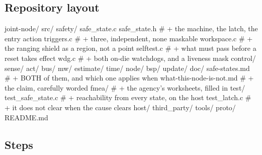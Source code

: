 \subsection*{Repository layout}

\begin{plaincode}
joint-node/
  src/
    safety/
      safe_state.c safe_state.h   # + the machine, the latch, the entry action
      triggers.c                  # + three, independent, none maskable
      workspace.c                 # + the ranging shield as a region, not a point
      selftest.c                  # + what must pass before a reset takes effect
      wdg.c                       # + both on-die watchdogs, and a liveness mask
    control/ sense/ act/ bus/ mw/ estimate/ time/ node/ bsp/  update/
  doc/
    safe-states.md                # + BOTH of them, and which one applies when
    what-this-node-is-not.md      # + the claim, carefully worded
    fmea/                         # + the agency's worksheets, filled in
  test/
    test_safe_state.c             # + reachability from every state, on the host
    test_latch.c                  # + it does not clear when the cause clears
  host/  third_party/  tools/  proto/  README.md
\end{plaincode}

\subsection*{Steps}

